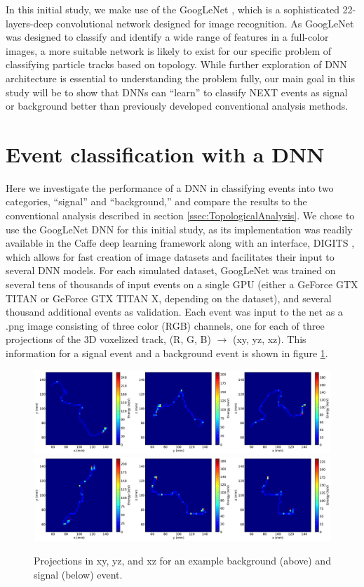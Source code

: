 \documentclass[a4paper,11pt]{article}
\begin{document}
In this initial study, we make use of the GoogLeNet \cite{Googlenet}, which is a sophisticated 22-layers-deep convolutional network designed for image recognition.  As GoogLeNet was
designed to classify and identify a wide range of features in a full-color images, a more suitable network is likely to exist for our specific problem of classifying particle tracks based on
topology.  While further exploration of DNN architecture is essential to understanding the problem fully, our main goal in this study will be to show that DNNs can ``learn'' to classify 
NEXT events as signal or background better than previously developed conventional analysis methods.

\section{Event classification with a DNN}
Here we investigate the performance of a DNN in classifying events into two categories, ``signal'' and ``background,'' and compare the results to the conventional analysis described in
section \ref{ssec:TopologicalAnalysis}.  We chose to use the GoogLeNet DNN for this initial study, as its implementation was readily available in the Caffe \cite{jia2014caffe}
deep learning framework along with an interface, DIGITS \cite{DIGITS}, which allows for fast creation of image datasets and facilitates their input to several DNN models.  For each simulated
dataset, GoogLeNet was trained on several tens of thousands of input events on a single GPU (either a GeForce GTX TITAN or GeForce GTX TITAN X, depending on the dataset), and several
thousand additional events as validation.  Each event was input to the net as a .png image consisting of three
color (RGB) channels, one for each of three projections of the 3D voxelized track, (R, G, B) $\rightarrow$ (xy, yz, xz).  This information for a signal event and a background event is
shown in figure \ref{fig.exampleProjs}.

\begin{figure}[!htb]
	\centering
	\includegraphics[scale=0.36]{fig/plt_h2D_vox_dnn3d_NEXT100_Paolina222_v2x2x2_r200x200x200_0_bg.pdf}
	\includegraphics[scale=0.36]{fig/plt_h2D_vox_dnn3d_NEXT100_Paolina222_v2x2x2_r200x200x200_2_si.pdf}
	\caption{\label{fig.exampleProjs}Projections in xy, yz, and xz for an example background (above) and signal (below) event.}
\end{figure}
\end{document}
